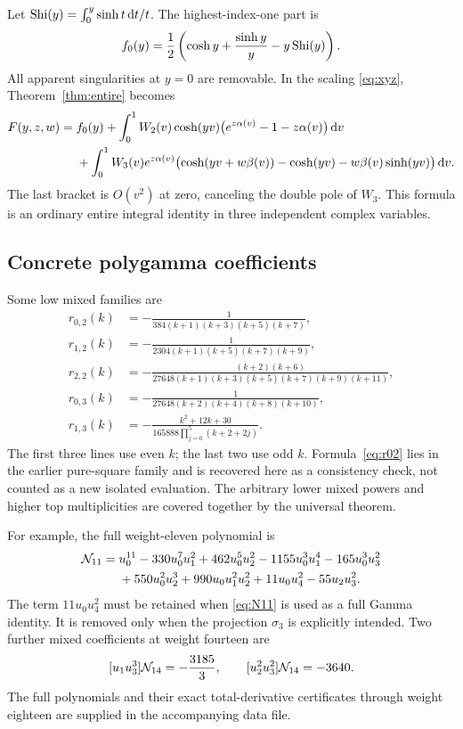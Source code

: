 Let $\operatorname{Shi}(y)=\int_0^y\sinh t\,\mathrm d t/t$. The highest-index-one part is
\begin{equation}\label{eq:f0}
 f_0(y)=\frac12\left(\cosh y+\frac{\sinh y}{y}-y\operatorname{Shi}(y)\right).
\end{equation}
All apparent singularities at $y=0$ are removable. In the scaling \eqref{eq:xyz}, Theorem~\ref{thm:entire} becomes
\begin{align}
 F(y,z,w)={}&f_0(y)
 +\int_0^1W_2(v)\cosh(yv)
       \bigl(e^{z\alpha(v)}-1-z\alpha(v)\bigr)\,\mathrm d v\notag\\
 &+\int_0^1W_3(v)e^{z\alpha(v)}
 \bigl(\cosh(yv+w\beta(v))-\cosh(yv)
                 -w\beta(v)\sinh(yv)\bigr)\,\mathrm d v.\label{eq:four-entire}
\end{align}
The last bracket is $O(v^2)$ at zero, canceling the double pole of $W_3$. This formula is an ordinary entire integral identity in three independent complex variables.

\subsection{Concrete polygamma coefficients}

Some low mixed families are
\begin{align}
 r_{0,2}(k)&=-\frac1{384(k+1)(k+3)(k+5)(k+7)},\label{eq:r02}\\
 r_{1,2}(k)&=-\frac1{2304(k+1)(k+5)(k+7)(k+9)},\label{eq:r12}\\
 r_{2,2}(k)&=-\frac{(k+2)(k+6)}
 {27648(k+1)(k+3)(k+5)(k+7)(k+9)(k+11)},\label{eq:r22}\\
 r_{0,3}(k)&=-\frac1{27648(k+2)(k+4)(k+8)(k+10)},\label{eq:r03}\\
 r_{1,3}(k)&=-\frac{k^2+12k+30}
 {165888\prod_{j=0}^{5}(k+2+2j)}.\label{eq:r13}
\end{align}
The first three lines use even $k$; the last two use odd $k$. Formula~\eqref{eq:r02} lies in the earlier pure-square family and is recovered here as a consistency check, not counted as a new isolated evaluation. The arbitrary lower mixed powers and higher top multiplicities are covered together by the universal theorem.

For example, the full weight-eleven polynomial is
\begin{align}
 \mathcal N_{11}={}&u_0^{11}-330u_0^7u_1^2+462u_0^5u_2^2
             -1155u_0^3u_1^4-165u_0^3u_3^2\notag\\
 &+550u_0^2u_2^3+990u_0u_1^2u_2^2
             +11u_0u_4^2-55u_2u_3^2.\label{eq:N11}
\end{align}
The term $11u_0u_4^2$ must be retained when \eqref{eq:N11} is used as a full Gamma identity. It is removed only when the projection $\sigma_3$ is explicitly intended. Two further mixed coefficients at weight fourteen are
\[
 [u_1u_3^3]\mathcal N_{14}=-\frac{3185}{3},\qquad
 [u_2^2u_3^2]\mathcal N_{14}=-3640.
\]
The full polynomials and their exact total-derivative certificates through weight eighteen are supplied in the accompanying data file.
